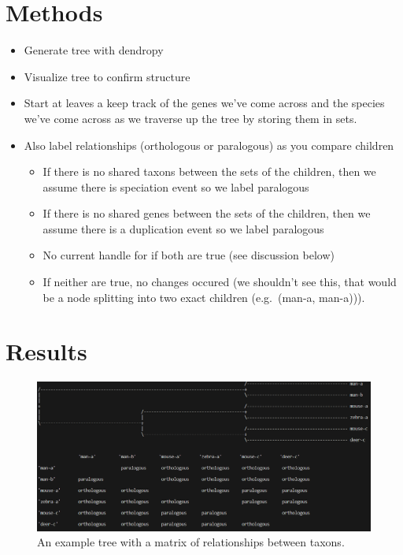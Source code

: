 \documentclass[
  11pt,
  letterpaper,
  oneside]{book}
\providecommand{\tightlist}{%
  \setlength{\itemsep}{0pt}\setlength{\parskip}{0pt}}\usepackage{longtable,booktabs,array}
\begin{document}
\hypertarget{methods}{%
\section{Methods}\label{methods}}

\begin{itemize}
\tightlist
\item
  Generate tree with dendropy
\item
  Visualize tree to confirm structure
\item
  Start at leaves a keep track of the genes we've come across and the
  species we've come across as we traverse up the tree by storing them
  in sets.
\item
  Also label relationships (orthologous or paralogous) as you compare
  children

  \begin{itemize}
  \tightlist
  \item
    If there is no shared taxons between the sets of the children, then
    we assume there is speciation event so we label paralogous
  \item
    If there is no shared genes between the sets of the children, then
    we assume there is a duplication event so we label paralogous
  \item
    No current handle for if both are true (see discussion below)
  \item
    If neither are true, no changes occured (we shouldn't see this, that
    would be a node splitting into two exact children (e.g.~(man-a,
    man-a))).
  \end{itemize}
\end{itemize}

\hypertarget{results}{%
\section{Results}\label{results}}

\begin{figure}

{\centering \includegraphics{./figures/Week1LabelingResult.PNG}

}

\caption{An example tree with a matrix of relationships between taxons.}

\end{figure}
\end{document}
